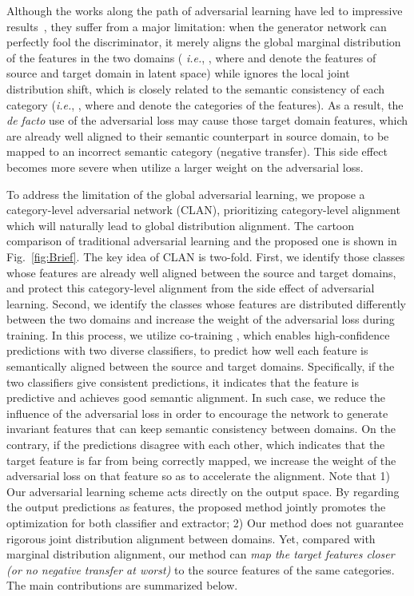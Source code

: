 \documentclass[10pt,twocolumn,letterpaper]{article}
\begin{document}
Although the works along the path of adversarial learning have led to impressive results~\cite{solomon2015WGAN,hoffman2016fcns,liu2016coupled,kim2017relations,tzeng2017adversarial,sankaranarayanan2017unsupervised}, they suffer from a major limitation: when the generator network can perfectly fool the discriminator, it merely aligns the global marginal distribution of the features in the two domains ( \emph{i.e.}, , where  and  denote the features of source and target domain in latent space) while ignores the local joint distribution shift, which is closely related to the semantic consistency of each category (\emph{i.e.}, , where  and  denote the categories of the features).  
As a result, the \emph{de facto} use of the adversarial loss may cause those target domain features, which are already well aligned to their semantic counterpart in source domain, to be mapped to an incorrect semantic category (negative transfer). This side effect becomes more severe when utilize a larger weight on the adversarial loss. 

To address the limitation of the global adversarial learning, we propose a category-level adversarial network (CLAN),  prioritizing category-level alignment which will naturally lead to global distribution alignment. The cartoon comparison of traditional adversarial learning and the proposed one is shown in Fig.~\ref{fig:Brief}. The key idea of CLAN is two-fold. First, we identify those classes whose features are already well aligned between the source and target domains, and protect this category-level alignment from the side effect of adversarial learning. Second, we identify the classes whose features are distributed differently between the two domains and increase the weight of the adversarial loss during training. In this process, we utilize co-training \cite{zhou2005cotrain}, which enables high-confidence predictions with two diverse classifiers, to predict how well each feature is semantically aligned between the source and target domains. Specifically, if the two classifiers give consistent predictions, it indicates that the feature is predictive and achieves good semantic alignment. In such case, we reduce the influence of the adversarial loss in order to encourage the network to generate invariant features that can keep semantic consistency between domains. On the contrary, if the predictions disagree with each other, which indicates that the target feature is far from being correctly mapped, we increase the weight of the adversarial loss on that feature so as to accelerate the alignment. Note that 1) Our adversarial learning scheme acts directly on the output space. By regarding the output predictions as features, the proposed method jointly promotes the optimization for both classifier and extractor; 2) Our method does not guarantee rigorous joint distribution alignment between domains. Yet, compared with marginal distribution alignment, our method can \emph{map the target features closer (or no negative transfer at worst)} to the source features of the same categories. The main contributions are summarized below.
\end{document}
